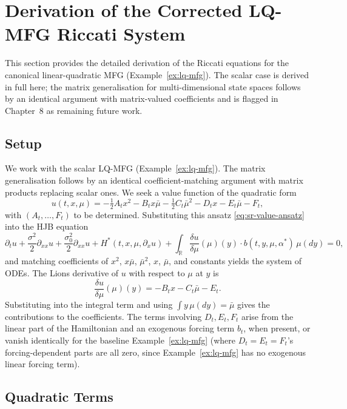 \section{Derivation of the Corrected LQ-MFG Riccati System}
\label{sec:appA-riccati}

This section provides the detailed derivation of the Riccati equations for the
canonical linear-quadratic MFG (Example~\ref{ex:lq-mfg}). The scalar case is derived
in full here; the matrix generalisation for multi-dimensional state spaces follows
by an identical argument with matrix-valued coefficients and is flagged in
Chapter~8 as remaining future work.

\subsection{Setup}

We work with the scalar LQ-MFG (Example~\ref{ex:lq-mfg}). The matrix
generalisation follows by an identical coefficient-matching argument with matrix
products replacing scalar ones. We seek a value function of the quadratic form
\begin{equation}
    u(t,x,\mu) = -\tfrac12 A_t x^2 - B_t x\bar\mu - \tfrac12 C_t \bar\mu^2 - D_t x -
    E_t \bar\mu - F_t,
    \label{eq:sr-value-ansatz}
\end{equation}
with $(A_t,\ldots,F_t)$ to be determined. Substituting this ansatz
\eqref{eq:sr-value-ansatz} into the HJB equation
\[
    \partial_t u + \frac{\sigma^2}{2}\partial_{xx} u + \frac{\sigma_0^2}{2}
    \partial_{xx} u + H^*(t,x,\mu,\partial_x u) + \int_{\mathbb{R}}
    \frac{\delta u}{\delta\mu}(\mu)(y) \cdot b(t,y,\mu,\alpha^*)\, \mu(dy) = 0,
\]
and matching coefficients of $x^2$, $x\bar\mu$, $\bar\mu^2$, $x$, $\bar\mu$, and
constants yields the system of ODEs. The Lions derivative of $u$ with respect to
$\mu$ at $y$ is
\[
    \frac{\delta u}{\delta\mu}(\mu)(y) = -B_t x - C_t \bar\mu - E_t.
\]
Substituting into the integral term and using $\int y\, \mu(dy) = \bar\mu$ gives
the contributions to the coefficients. The terms involving $D_t, E_t, F_t$ arise
from the linear part of the Hamiltonian and an exogenous forcing term $b_t$, when
present, or vanish identically for the baseline Example~\ref{ex:lq-mfg} (where
$D_t = E_t = F_t$'s forcing-dependent parts are all zero, since Example~\ref{ex:lq-mfg}
has no exogenous linear forcing term).

\subsection{Quadratic Terms}

